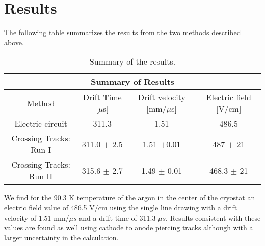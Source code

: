 \section{Results}\label{sec:Results}
The following table summarizes the results from the two methods described above.
\begin{center}
\begin{table}[htb]
  \begin{center}
    \begin{tabular}{c|c|c|c}
      \multicolumn{4}{c}{\textbf{Summary of Results}} \\
      \hline \hline
       Method & Drift Time [$\mu$s] & Drift velocity [mm/$\mu$s]  & Electric field [V/cm]\\
       \hline
       Electric circuit        & 311.3  & 1.51 & 486.5 \\
       \hline
       Crossing Tracks: Run I  & 311.0 $\pm$ 2.5 & 1.51 $\pm$0.01 & 487 $\pm$ 21 \\
       \hline
       Crossing Tracks: Run II & 315.6 $\pm$ 2.7 & 1.49 $\pm$ 0.01 & 468.3 $\pm$ 21  \\
       \hline
       \hline
       \end{tabular}%
    \caption{Summary of the results. }
    \label{tab:ResultsFinal}
    \end{center}
\end{table}
\end{center}

We find for the 90.3 K temperature of the argon in the center of the cryostat an electric field value of 486.5 V/cm using the single line drawing with a drift velocity of 1.51 mm/$\mu s$ and a drift time of 311.3 $\mu s$. Results consistent with these values are found as well using cathode to anode piercing tracks although with a larger uncertainty in the calculation.
